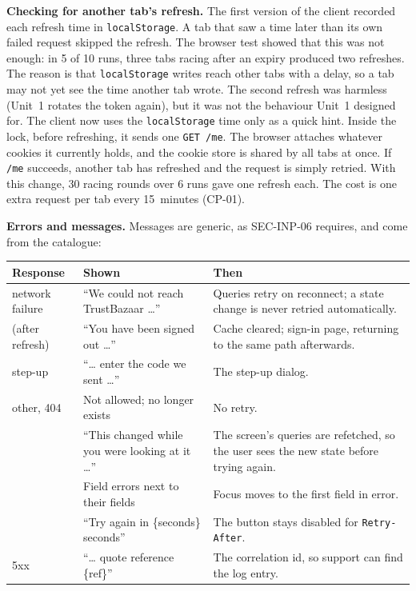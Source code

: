 \documentclass[11pt,a4paper]{article}
\newenvironment{dtable}[1]{\small\begin{longtable}{#1}}{\end{longtable}}
\begin{document}
\textbf{Checking for another tab's refresh.} The first version of the client recorded each refresh time in \texttt{localStorage}. A tab that saw a time later than its own failed request skipped the refresh. The browser test showed that this was not enough: in 5 of 10 runs, three tabs racing after an expiry produced two refreshes. The reason is that \texttt{localStorage} writes reach other tabs with a delay, so a tab may not yet see the time another tab wrote. The second refresh was harmless (Unit~1 rotates the token again), but it was not the behaviour Unit~1 designed for. The client now uses the \texttt{localStorage} time only as a quick hint. Inside the lock, before refreshing, it sends one \texttt{GET /me}. The browser attaches whatever cookies it currently holds, and the cookie store is shared by all tabs at once. If \texttt{/me} succeeds, another tab has refreshed and the request is simply retried. With this change, 30 racing rounds over 6 runs gave one refresh each. The cost is one extra request per tab every 15~minutes (CP-01).

\textbf{Errors and messages.} Messages are generic, as SEC-INP-06 requires, and come from the catalogue:
\begin{dtable}{@{}>{\raggedright\arraybackslash}p{2.6cm}>{\raggedright\arraybackslash}p{6.4cm}>{\raggedright\arraybackslash}p{6.2cm}@{}}
\toprule
\textbf{Response} & \textbf{Shown} & \textbf{Then} \\ \midrule \endhead
network failure & ``We could not reach TrustBazaar \dots'' & Queries retry on reconnect; a state change is never retried automatically. \\
401 (after refresh) & ``You have been signed out \dots'' & Cache cleared; sign-in page, returning to the same path afterwards. \\
403 step-up & ``\dots{} enter the code we sent \dots'' & The step-up dialog. \\
403 other, 404 & Not allowed; no longer exists & No retry. \\
409 & ``This changed while you were looking at it \dots'' & The screen's queries are refetched, so the user sees the new state before trying again. \\
422 & Field errors next to their fields & Focus moves to the first field in error. \\
429 & ``Try again in \{seconds\} seconds'' & The button stays disabled for \texttt{Retry-After}. \\
5xx & ``\dots{} quote reference \{ref\}'' & The correlation id, so support can find the log entry. \\
\bottomrule
\end{dtable}
\end{document}

